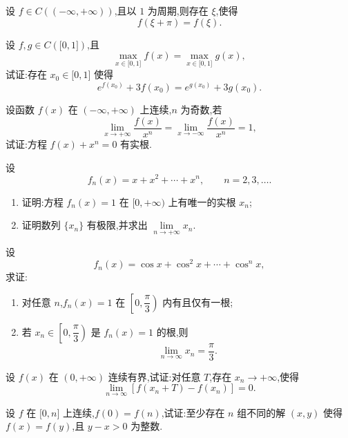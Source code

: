 \documentclass[../数学分析培优讲义.tex]{subfiles}
\begin{document}
\begin{example}
设 $f\in C(( -\infty,+\infty))$,且以 $1$ 为周期,则存在 $\xi$,使得
\[
    f(\xi+\pi)=f(\xi).
\]
\end{example}
\exampleblank

\begin{example}
设 $f,g\in C(\lbrack 0,1\rbrack)$,且
\[
    \max\limits_{x\in\lbrack 0,1\rbrack}f(x)=\max\limits_{x\in\lbrack 0,1\rbrack}g(x),
\]
试证:存在 $x_0\in\lbrack 0,1\rbrack$ 使得
\[
    e^{f(x_0)}+3f(x_0)=e^{g(x_0)}+3g(x_0).
\]
\end{example}
\exampleblank

\begin{example}
设函数 $f(x)$ 在 $(-\infty,+\infty)$ 上连续,$n$ 为奇数,若
\[
    \lim\limits_{x\to+\infty}\dfrac{f(x)}{x^n}
    =\lim\limits_{x\to-\infty}\dfrac{f(x)}{x^n}=1,
\]
试证:方程 $f(x)+x^n=0$ 有实根.
\end{example}
\exampleblank

\begin{example}
设
\[
    f_n(x)=x+x^2+\cdots+x^n,
    \qquad n=2,3,\ldots.
\]
\begin{enumerate}[label=(\arabic*)]
    \item 证明:方程 $f_n(x)=1$ 在 $\lbrack 0,+\infty)$ 上有唯一的实根 $x_n$;
    \item 证明数列 $\{x_n\}$ 有极限,并求出 $\displaystyle\lim\limits_{n\to+\infty}x_n$.
\end{enumerate}
\end{example}
\exampleblank

\begin{example}
设
\[
    f_n(x)=\cos x+\cos^2x+\cdots+\cos^n x,
\]
求证:
\begin{enumerate}[label=(\arabic*)]
    \item 对任意 $n$,$f_n(x)=1$ 在 $\left[0,\dfrac{\pi}{3}\right)$ 内有且仅有一根;
    \item 若 $x_n\in\left[0,\dfrac{\pi}{3}\right)$ 是 $f_n(x)=1$ 的根,则
    \[
        \lim\limits_{n\to\infty}x_n=\dfrac{\pi}{3}.
    \]
\end{enumerate}
\end{example}
\exampleblank

\begin{example}
设 $f(x)$ 在 $(0,+\infty)$ 连续有界,试证:对任意 $T$,存在 $x_n\to+\infty$,使得
\[
    \lim\limits_{n\to\infty}[f(x_n+T)-f(x_n)]=0.
\]
\end{example}
\exampleblank

\begin{example}
设 $f$ 在 $\lbrack 0,n\rbrack$ 上连续,$f(0)=f(n)$,试证:至少存在 $n$ 组不同的解 $(x,y)$ 使得 $f(x)=f(y)$,且 $y-x>0$ 为整数.
\end{example}
\exampleblank
\end{document}
